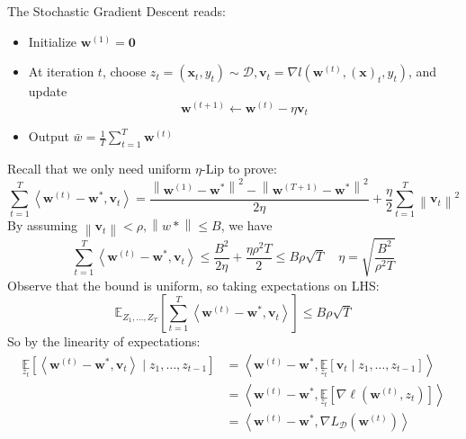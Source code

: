 \documentclass{book}
\newcommand{\D}{\mathcal{D}}
\begin{document}
 The Stochastic Gradient Descent reads:

 
\begin{itemize}
\item Initialize $\mathbf{w}^{(1)}=\mathbf{0}$
\item At iteration $t$, choose $z_t= \left(\mathbf{x}_{t},y_{t}\right)\sim \D, \mathbf{v}_t=\nabla l \left( \mathbf{w}^{(t)},(\mathbf{x})_t,y_t \right)$, and update 
\begin{equation}
\mathbf{w}^{(t+1)}\leftarrow \mathbf{w}^{(t)}-\eta \mathbf{v}_t
\end{equation}
\item Output $\bar{w}=\frac{1}{T}\sum_{t=1}^T \mathbf{w}^{(t)}$
\end{itemize}

Recall that we only need uniform $\eta$-Lip to prove: 
\begin{equation}
\sum\limits_{t=1}^{T}\left\langle \mathbf{w}^{(t)}-\mathbf{w}^{*}, \mathbf{v}_t \right\rangle =\frac{\left\| \mathbf{w}^{(1)}-\mathbf{w}^{*} \right\|^{2}-\left\|\mathbf{w}^{(T+1)}-\mathbf{w}^{*} \right\|^{2}}{2\eta}+\frac{\eta}{2}\sum\limits_{t=1}^{T}\left\| \mathbf{v}_t \right\|^2
\end{equation}
By assuming $\left\| \mathbf{v}_t \right\|<\rho ,\left\| w* \right\|\leq B$, we have 
\begin{equation}
\sum\limits_{t=1}^{T}\left\langle \mathbf{w}^{(t)}-\mathbf{w}^{*}, \mathbf{v}_t \right\rangle\leq \frac{B^2}{2\eta}+\frac{\eta\rho^2T}{2}\leq B\rho \sqrt{T} \quad \eta=\sqrt{\frac{B^2}{\rho^2 T}}
\end{equation}
Observe that the bound is uniform, so taking expectations on LHS:
\begin{equation}
\mathbb{E}_{Z_{1},\dots, Z_T}\left[ \sum_{t=1}^T \left\langle \mathbf{w}^{(t)}-\mathbf{w}^{*}, \mathbf{v}_t \right\rangle \right] \leq B\rho \sqrt{T}
\end{equation}
So by the linearity of expectations:
\[
\begin{aligned}
\underset{z_{t}}{\mathbb{E}}\left[\left\langle\boldsymbol{w}^{(t)}-\boldsymbol{w}^{*}, \boldsymbol{v}_{t}\right\rangle \mid z_{1}, \ldots, z_{t-1}\right] &=\left\langle\boldsymbol{w}^{(t)}-\boldsymbol{w}^{*}, \underset{z_{t}}{\mathbb{E}}\left[\boldsymbol{v}_{t} \mid z_{1}, \ldots, z_{t-1}\right]\right\rangle \\
&=\left\langle\boldsymbol{w}^{(t)}-\boldsymbol{w}^{*}, \underset{z_{t}}{\mathbb{E}}\left[\nabla \ell\left(\boldsymbol{w}^{(t)}, z_{t}\right)\right]\right\rangle \\
&=\left\langle\boldsymbol{w}^{(t)}-\boldsymbol{w}^{*}, \nabla L_{\mathcal{D}}\left(\boldsymbol{w}^{(t)}\right)\right\rangle
\end{aligned}
\]
\end{document}
